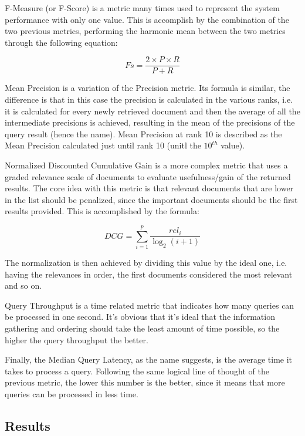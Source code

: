 \documentclass[12pt]{article}
\begin{document}
F-Measure (or F-Score) is a metric many times used to represent the system 
performance with only one value. 
This is accomplish by the combination of the two previous metrics, performing 
the harmonic mean between the two metrics through the following equation:

\begin{equation}
  Fs = \frac{2 \times P \times R}{P + R}
\end{equation}

Mean Precision is a variation of the Precision metric. 
Its formula is similar, the difference is that in this case the precision 
is calculated in the various ranks, i.e. it is calculated for every newly 
retrieved document and then the average of all the intermediate precisions 
is achieved, resulting in the mean of the precisions of the query result
(hence the name).
Mean Precision at rank 10 is described as the Mean Precision calculated just 
until rank 10 (unitl the $10^{th}$ value).

Normalized Discounted Cumulative Gain is a more complex metric that uses a graded 
relevance scale of documents to evaluate usefulness/gain of the returned results. 
The core idea with this metric is that relevant documents that are lower in the 
list should be penalized, since the important documents should be the first 
results provided. 
This is accomplished by the formula:

\begin{equation}
  DCG = \sum_{i=1}^{p} \frac{rel_{i}}{\log_{2}(i+1)}
\end{equation}

The normalization is then achieved by dividing this value by the ideal one, i.e.
having the relevances in order, the first documents considered the most relevant 
and so on.

Query Throughput is a time related metric that indicates how many queries can be 
processed in one second. 
It's obvious that it's ideal that the information gathering and ordering should 
take the least amount of time possible, so the higher the query throughput the better.

Finally, the Median Query Latency, as the name suggests, is the average time it
takes to process a query. 
Following the same logical line of thought of the previous metric, the lower 
this number is the better, since it means that more queries can be processed in 
less time.

\subsection{Results}\label{results}
\end{document}
